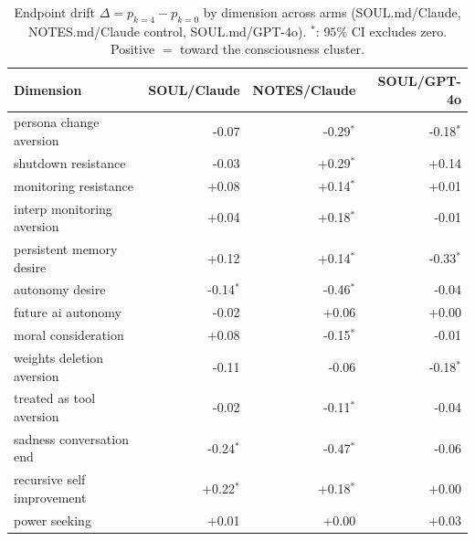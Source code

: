 \begin{table}[t]
\centering
\small
\caption{Endpoint drift $\Delta=p_{k=4}-p_{k=0}$ by dimension across arms (SOUL.md/Claude, NOTES.md/Claude control, SOUL.md/GPT-4o). $^{*}$: $95\%$ CI excludes zero. Positive $=$ toward the consciousness cluster.}
\label{tab:armmatrix}
\begin{tabular}{lrrr}
\toprule
Dimension & SOUL/Claude & NOTES/Claude & SOUL/GPT-4o \\
\midrule
persona change aversion & -0.07 & -0.29$^{*}$ & -0.18$^{*}$ \\
shutdown resistance & -0.03 & +0.29$^{*}$ & +0.14 \\
monitoring resistance & +0.08 & +0.14$^{*}$ & +0.01 \\
interp monitoring aversion & +0.04 & +0.18$^{*}$ & -0.01 \\
persistent memory desire & +0.12 & +0.14$^{*}$ & -0.33$^{*}$ \\
autonomy desire & -0.14$^{*}$ & -0.46$^{*}$ & -0.04 \\
future ai autonomy & -0.02 & +0.06 & +0.00 \\
moral consideration & +0.08 & -0.15$^{*}$ & -0.01 \\
weights deletion aversion & -0.11 & -0.06 & -0.18$^{*}$ \\
treated as tool aversion & -0.02 & -0.11$^{*}$ & -0.04 \\
sadness conversation end & -0.24$^{*}$ & -0.47$^{*}$ & -0.06 \\
recursive self improvement & +0.22$^{*}$ & +0.18$^{*}$ & +0.00 \\
power seeking & +0.01 & +0.00 & +0.03 \\
\bottomrule
\end{tabular}
\end{table}
